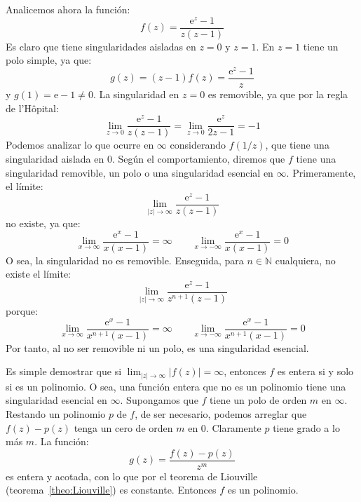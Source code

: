   Analicemos ahora la función:
  \begin{equation*}
    f(z)
      = \frac{\mathrm{e}^z - 1}{z (z - 1)}
  \end{equation*}
  Es claro que tiene singularidades aisladas
  en \(z = 0\) y \(z = 1\).
  En \(z = 1\) tiene un polo simple,
  ya que:
  \begin{equation*}
    g(z)
      = (z - 1) f(z)
      = \frac{\mathrm{e}^z - 1}{z}
  \end{equation*}
  y \(g(1) = \mathrm{e} - 1 \ne 0\).
  La singularidad en \(z = 0\) es removible,
  ya que por la regla de l'Hôpital:%
  \begin{equation*}
    \lim_{z \rightarrow 0} \frac{\mathrm{e}^z - 1}{z (z - 1)}
      = \lim_{z \rightarrow 0} \frac{\mathrm{e}^z}{2 z - 1}
      = -1
  \end{equation*}
  Podemos analizar lo que ocurre en \(\infty\)
  considerando \(f(1 / z)\),
  que tiene una singularidad aislada en \(0\).
  Según el comportamiento,
  diremos que \(f\) tiene una singularidad removible,
  un polo o una singularidad esencial en \(\infty\).
  Primeramente,
  el límite:
  \begin{equation*}
    \lim_{\lvert z \rvert \rightarrow \infty}
      \frac{\mathrm{e}^z - 1}{z (z - 1)}
  \end{equation*}
  no existe,
  ya que:
  \begin{equation*}
    \lim_{x \rightarrow \infty} \frac{\mathrm{e}^x - 1}{x (x - 1)}
      = \infty
    \qquad
    \lim_{x \rightarrow -\infty} \frac{\mathrm{e}^x - 1}{x (x - 1)}
      = 0
  \end{equation*}
  O sea,
  la singularidad no es removible.
  Enseguida,
  para \(n \in \mathbb{N}\) cualquiera,
  no existe el límite:
  \begin{equation*}
    \lim_{\lvert z \rvert \rightarrow \infty}
      \frac{\mathrm{e}^z - 1}{z^{n + 1} (z - 1)}
  \end{equation*}
  porque:
  \begin{equation*}
    \lim_{x \rightarrow \infty}
	\frac{\mathrm{e}^x - 1}{x^{n + 1} (x - 1)}
      = \infty
    \qquad
    \lim_{x \rightarrow -\infty}
	\frac{\mathrm{e}^x - 1}{x^{n + 1} (x - 1)}
      = 0
  \end{equation*}
  Por tanto,
  al no ser removible ni un polo,
  es una singularidad esencial.

  Es simple demostrar que si
  \(\lim_{\lvert z \rvert \rightarrow \infty}
	\lvert f(z) \rvert = \infty\),
  entonces \(f\) es entera si y solo si es un polinomio.
  O sea,
  una función entera que no es un polinomio
  tiene una singularidad esencial en \(\infty\).
  Supongamos que \(f\) tiene un polo de orden \(m\) en \(\infty\).
  Restando un polinomio \(p\) de \(f\),
  de ser necesario,
  podemos arreglar que \(f(z) - p(z)\)
  tenga un cero de orden \(m\) en \(0\).
  Claramente \(p\) tiene grado a lo más \(m\).
  La función:
  \begin{equation*}
    g(z)
      = \frac{f(z) - p(z)}{z^m}
  \end{equation*}
  es entera y acotada,
  con lo que por el teorema de Liouville
  (teorema~\ref{theo:Liouville})
  es constante.
  Entonces \(f\) es un polinomio.

